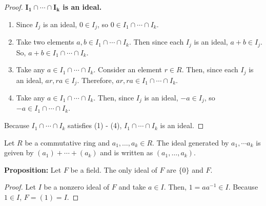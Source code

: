 \documentclass [12pt] {article}
\newenvironment{definition}[1]{\begin{tcolorbox}[title={Definition: #1},colback=blue!5!white,colframe=black!75!blue]}{\end{tcolorbox}}
\renewcommand{\bf}[1]{\textbf{{#1}}}
\begin{document}
\begin{proof}
    \newpage
    \bf{$\bm{I_1 \cap \cdots \cap I_k}$ is an ideal.}
    \begin{enumerate}[label=(\arabic*), itemsep=0em]
        \item Since $I_j$ is an ideal, $0 \in I_j$, so 
            $0 \in I_1 \cap \cdots \cap I_k$.
        \item Take two elements $a, b \in I_1 \cap \cdots \cap I_k$. 
            Then since each $I_j$ is an ideal, $a + b \in I_j$. So, 
            $a + b \in I_1 \cap \cdots \cap I_k$.
        \item Take any $a \in I_1 \cap \cdots \cap I_k$. Consider an element 
            $r \in R$. Then, since each $I_j$ is an ideal, $ar, ra \in I_j$. Therefore, 
            $ar, ra \in I_1 \cap \cdots \cap I_k$.
        \item Take any $a \in I_1 \cap \cdots \cap I_k$. 
            Then, since $I_j$ is an ideal, $-a \in I_j$, so $-a \in I_1 \cap \cdots \cap I_k$.
    \end{enumerate}
    Because $I_1 \cap \cdots \cap I_k$ satisfies (1) - (4), $I_1 \cap \cdots \cap I_k$ is an ideal.
\end{proof}

\begin{definition}{Multiple Generators}
    Let $R$ be a commutative ring and $a_1, \ldots, a_k \in R$. The ideal generated by 
    $a_1, \cdots a_k$ is geiven by $(a_1) + \cdots + (a_k)$ and is written as $(a_1, \ldots, a_k)$.
\end{definition}
\bf{Proposition:} Let $F$ be a field. The only ideal of $F$ are $\{ 0 \}$ and $F$.
\begin{proof}
    Let $I$ be a nonzero ideal of $F$ and take $a \in I$. Then, $1 = aa^{-1} \in I$. Because $1 \in I$, 
    $F = (1) = I$.
\end{proof}
\end{document}
